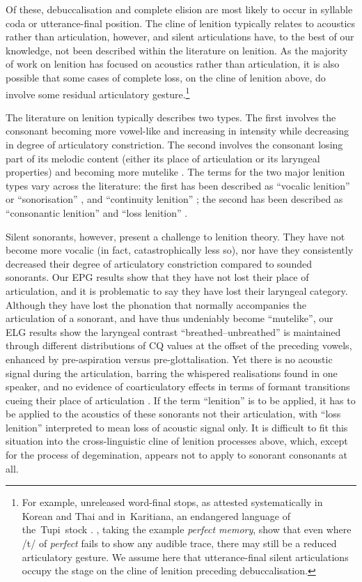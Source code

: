 \documentclass[output=paper]{langscibook}
\begin{document}
{Of these, debuccalisation and complete elision are most likely to occur in syllable coda or utterance-final position. The cline of lenition typically relates to acoustics rather than articulation, however, and silent articulations have, to the best of our knowledge, not been described within the literature on lenition. As the majority of work on lenition has focused on acoustics rather than articulation, it is also possible that some cases of complete loss, on the cline of lenition above, do involve some residual articulatory gesture.}\footnote{For example, unreleased word-final stops, as attested systematically in Korean and Thai \citep{Tsukada2004} and in~Karitiana, an endangered language of the~Tupi~stock \citep{StortoDemolin2002}. \citet{BrowmanGoldstein1987,BrowmanGoldstein1989}, taking the example \textit{perfect memory}, show that even where \mbox{/t/} of \textit{perfect} fails to show any audible trace, there may still be a reduced articulatory gesture. We assume here that utterance-final silent articulations occupy the stage on the cline of lenition preceding debuccalisation.}

{The literature on lenition typically describes two types. The first involves the consonant becoming more vowel-like and increasing in intensity while decreasing in degree of articulatory constriction. The second involves the consonant losing part of its melodic content (either its place of articulation or its laryngeal properties) and becoming more mutelike \citep{Szigetvári2008}. The terms for the two major lenition types vary across the literature: the first has been described as ``vocalic lenition'' or
``sonorisation'' \citep{Szigetvári2008}, and
``continuity lenition'' \citep{Katz2016}; the second has been described as
``consonantic lenition'' \citep{Szigetvári2008} and
``loss lenition'' \citep{Katz2016}.}

Silent sonorants, however, present a challenge to lenition theory. They have not become more vocalic (in fact, catastrophically less so), nor have they consistently decreased their degree of articulatory constriction compared to sounded sonorants. Our EPG results show that they have not lost their place of articulation, and it is problematic to say they have lost their laryngeal category. Although they have lost the phonation that normally accompanies the articulation of a sonorant, and have thus undeniably become ``mutelike'', our ELG results show the laryngeal contrast ``breathed–unbreathed'' is maintained through different distributions of CQ values at the offset of the preceding vowels, enhanced by pre-aspiration versus pre-glottalisation. Yet there is no acoustic signal during the articulation, barring the whispered realisations found in one speaker, and no evidence of coarticulatory effects in terms of formant transitions cueing their place of articulation {\citep{DelattreEtAl1955}}. If the term ``lenition'' is to be applied, it has to be applied to the acoustics of these sonorants not their articulation, with ``loss lenition'' \citep{Katz2016} interpreted to mean loss of acoustic signal only. It is difficult to fit this situation into the cross-linguistic cline of lenition processes above, which, except for the process of degemination, appears not to apply to sonorant consonants at all.
\end{document}
